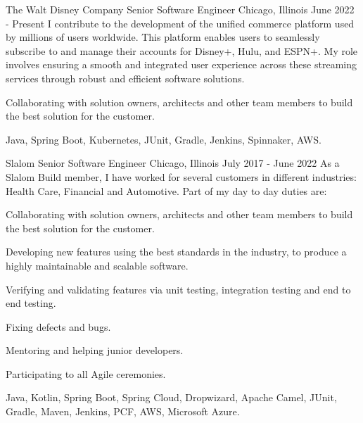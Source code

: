 
\begin{cventries}

  \experienceentry
  {The Walt Disney Company} %
    {Senior Software Engineer} %
    {Chicago, Illinois} %
    {June 2022 - Present} %
    {I contribute to the development of the unified commerce platform used by millions of users worldwide. This platform enables users to seamlessly subscribe to and manage their accounts for Disney+, Hulu, and ESPN+. My role involves ensuring a smooth and integrated user experience across these streaming services through robust and efficient software solutions.}
    {
      \begin{cvitems} %
      	\item {Collaborating with solution owners, architects and other team members to build the best solution for the customer.}
      \end{cvitems}
    }
    {Java, Spring Boot, Kubernetes, JUnit, Gradle, Jenkins, Spinnaker, AWS.}

  \experienceentry
  {Slalom} %
    {Senior Software Engineer} %
    {Chicago, Illinois} %
    {July 2017 - June 2022} %
    {As a Slalom Build member, I have worked for several customers in different industries: Health Care, Financial and Automotive. Part of my day to day duties are:}
    {
      \begin{cvitems} %
      	\item {Collaborating with solution owners, architects and other team members to build the best solution for the customer.}
      	\item {Developing new features using the best standards in the industry, to produce a highly maintainable and scalable software.}
      	\item {Verifying and validating features via unit testing, integration testing and end to end testing.}
      	\item {Fixing defects and bugs.}
      	\item {Mentoring and helping junior developers.}
        \item {Participating to all Agile ceremonies.}
      \end{cvitems}
    }
    {Java, Kotlin, Spring Boot, Spring Cloud, Dropwizard, Apache Camel, JUnit, Gradle, Maven, Jenkins, PCF, AWS, Microsoft Azure.}
  

\end{cventries}
